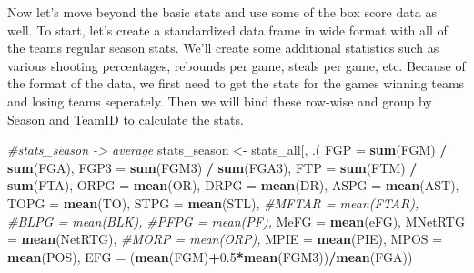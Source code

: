 \documentclass[]{article}
\newenvironment{Shaded}{\begin{snugshade}}{\end{snugshade}}
\newcommand{\KeywordTok}[1]{\textcolor[rgb]{0.13,0.29,0.53}{\textbf{#1}}}
\newcommand{\DataTypeTok}[1]{\textcolor[rgb]{0.13,0.29,0.53}{#1}}
\newcommand{\FloatTok}[1]{\textcolor[rgb]{0.00,0.00,0.81}{#1}}
\newcommand{\StringTok}[1]{\textcolor[rgb]{0.31,0.60,0.02}{#1}}
\newcommand{\CommentTok}[1]{\textcolor[rgb]{0.56,0.35,0.01}{\textit{#1}}}
\newcommand{\OperatorTok}[1]{\textcolor[rgb]{0.81,0.36,0.00}{\textbf{#1}}}
\newcommand{\NormalTok}[1]{#1}
\begin{document}
Now let's move beyond the basic stats and use some of the box score data
as well. To start, let's create a standardized data frame in wide format
with all of the teams regular season stats. We'll create some additional
statistics such as various shooting percentages, rebounds per game,
steals per game, etc. Because of the format of the data, we first need
to get the stats for the games winning teams and losing teams
seperately. Then we will bind these row-wise and group by Season and
TeamID to calculate the stats.

\begin{Shaded}
\begin{Highlighting}[]
\CommentTok{#stats_season -> average}
\NormalTok{stats_season <-}\StringTok{ }\NormalTok{stats_all[, .(}
    \DataTypeTok{FGP =} \KeywordTok{sum}\NormalTok{(FGM) }\OperatorTok{/}\StringTok{ }\KeywordTok{sum}\NormalTok{(FGA),}
    \DataTypeTok{FGP3 =} \KeywordTok{sum}\NormalTok{(FGM3) }\OperatorTok{/}\StringTok{ }\KeywordTok{sum}\NormalTok{(FGA3),}
    \DataTypeTok{FTP =} \KeywordTok{sum}\NormalTok{(FTM) }\OperatorTok{/}\StringTok{ }\KeywordTok{sum}\NormalTok{(FTA),}
    \DataTypeTok{ORPG =} \KeywordTok{mean}\NormalTok{(OR),}
    \DataTypeTok{DRPG =} \KeywordTok{mean}\NormalTok{(DR),}
    \DataTypeTok{ASPG =} \KeywordTok{mean}\NormalTok{(AST),}
    \DataTypeTok{TOPG =} \KeywordTok{mean}\NormalTok{(TO),}
    \DataTypeTok{STPG =} \KeywordTok{mean}\NormalTok{(STL),}
    \CommentTok{#MFTAR = mean(FTAR),}
    \CommentTok{#BLPG = mean(BLK),}
    \CommentTok{#PFPG = mean(PF),}
    \DataTypeTok{MeFG =} \KeywordTok{mean}\NormalTok{(eFG),}
    \DataTypeTok{MNetRTG =} \KeywordTok{mean}\NormalTok{(NetRTG),}
    \CommentTok{#MORP = mean(ORP),}
    \DataTypeTok{MPIE =} \KeywordTok{mean}\NormalTok{(PIE),}
    \DataTypeTok{MPOS =} \KeywordTok{mean}\NormalTok{(POS),}
    \DataTypeTok{EFG =}\NormalTok{ (}\KeywordTok{mean}\NormalTok{(FGM)}\OperatorTok{+}\FloatTok{0.5}\OperatorTok{*}\KeywordTok{mean}\NormalTok{(FGM3))}\OperatorTok{/}\KeywordTok{mean}\NormalTok{(FGA))}
    

\end{Highlighting}
\end{Shaded}
\end{document}
